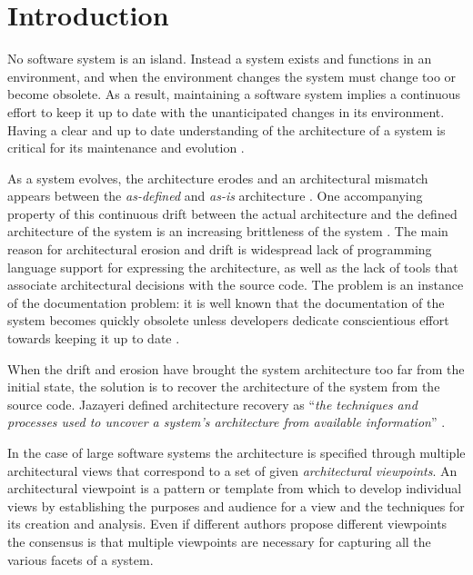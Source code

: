 \documentclass[preprint,12pt]{elsarticle}
\begin{document}
\section{Introduction} \label{sec:Introduction}

No software system is an island. Instead a system exists and functions in an environment, and when the environment changes the system must change too or become obsolete\cite{lehman-softev}. As a result, maintaining a software system implies a continuous effort to keep it up to date with the unanticipated changes in its environment. Having a clear and up to date understanding of the architecture of a system is critical for its maintenance and evolution \cite{Duca09c, pollet-sar}.

As a system evolves, the architecture erodes \cite{perry-foundations} and an architectural mismatch appears between the {\em as-defined} and {\em as-is} architecture \cite{garlan-mismatch}. One accompanying property of this continuous drift between the actual architecture and the defined architecture of the system is an increasing brittleness of the system \cite{perry-foundations}. The main reason for architectural erosion and drift is widespread lack of programming language support for expressing the architecture, as well as the lack of tools that associate architectural decisions with the source code. The problem is an instance of the documentation problem: it is well known that the documentation of the system becomes quickly obsolete unless developers dedicate conscientious effort towards keeping it up to date \cite{riva-report}.

When the drift and erosion have brought the system architecture too far from the initial state, the solution is to recover the architecture of the system from the source code. Jazayeri defined architecture recovery as ``{\em the techniques and processes used to uncover a system's architecture from available information}'' \cite{jaza-archevo}. 

In the case of large software systems the architecture is specified through multiple architectural views that correspond to a set of given {\em architectural viewpoints}. An architectural viewpoint is a pattern or template from which to develop individual views by establishing the purposes and audience for a view and the techniques for its creation and analysis. Even if different authors propose different viewpoints \cite{bass-architecture, kruchten-4plus, hof-apparch} the consensus is that multiple viewpoints are necessary for capturing all the various facets of a system.
\end{document}
